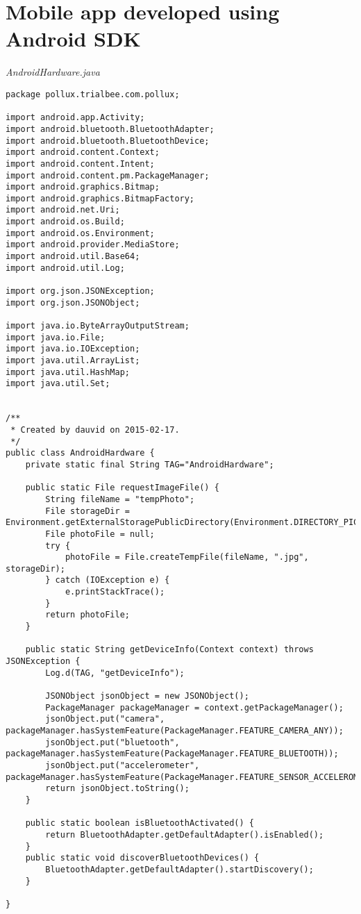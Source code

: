 \newpage
\appendix
\section{Mobile app developed using Android SDK} \label{App:AppendixA}

\emph{AndroidHardware.java}
\begin{lstlisting}
package pollux.trialbee.com.pollux;

import android.app.Activity;
import android.bluetooth.BluetoothAdapter;
import android.bluetooth.BluetoothDevice;
import android.content.Context;
import android.content.Intent;
import android.content.pm.PackageManager;
import android.graphics.Bitmap;
import android.graphics.BitmapFactory;
import android.net.Uri;
import android.os.Build;
import android.os.Environment;
import android.provider.MediaStore;
import android.util.Base64;
import android.util.Log;

import org.json.JSONException;
import org.json.JSONObject;

import java.io.ByteArrayOutputStream;
import java.io.File;
import java.io.IOException;
import java.util.ArrayList;
import java.util.HashMap;
import java.util.Set;


/**
 * Created by dauvid on 2015-02-17.
 */
public class AndroidHardware {
    private static final String TAG="AndroidHardware";

    public static File requestImageFile() {
        String fileName = "tempPhoto";
        File storageDir = Environment.getExternalStoragePublicDirectory(Environment.DIRECTORY_PICTURES);
        File photoFile = null;
        try {
            photoFile = File.createTempFile(fileName, ".jpg", storageDir);
        } catch (IOException e) {
            e.printStackTrace();
        }
        return photoFile;
    }

    public static String getDeviceInfo(Context context) throws JSONException {
        Log.d(TAG, "getDeviceInfo");

        JSONObject jsonObject = new JSONObject();
        PackageManager packageManager = context.getPackageManager();
        jsonObject.put("camera", packageManager.hasSystemFeature(PackageManager.FEATURE_CAMERA_ANY));
        jsonObject.put("bluetooth", packageManager.hasSystemFeature(PackageManager.FEATURE_BLUETOOTH));
        jsonObject.put("accelerometer", packageManager.hasSystemFeature(PackageManager.FEATURE_SENSOR_ACCELEROMETER));
        return jsonObject.toString();
    }

    public static boolean isBluetoothActivated() {
        return BluetoothAdapter.getDefaultAdapter().isEnabled();
    }
    public static void discoverBluetoothDevices() {
        BluetoothAdapter.getDefaultAdapter().startDiscovery();
    }

}
\end{lstlisting}
